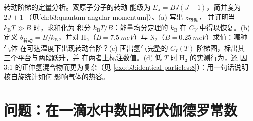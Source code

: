 \begin{exercise}[$\star\star\star$]\label{exo:b3:canonical-ensemble:12}
转动阶梯的定量分析。双原子分子的转动
能级为 $E_J = BJ(J+1)$，简并度为 $2J + 1$
（见\cref{ch:b3:quantum-angular-momentum}）。(a) 写出 $z_{\text{转动}}$，
并证明当 $k_{\text{B}}T \gg B$ 时，求和化为
积分 $k_{\text{B}}T/B$：能量均分定理的 $k_{\text{B}}$ 在
$C_V$ 中得以恢复。(b) 定义 $\theta_{\text{转动}} =
B/k_{\text{B}}$，并对 H$_2$（$B = \qty{7.5}{meV}$）与
N$_2$（$B = \qty{0.25}{meV}$）求值：哪种气体
在可达温度下出现转动台阶？(c) 画出氢气完整的 $C_V(T)$
阶梯图，标出其三个平台与两段跃升，并
在两者上标注数值。(d) 低 $T$ 时 H$_2$ 的实测行为，还
因 3:1 的正仲氢混合物而更为复杂（见
\cref{exo:b3:identical-particles:8}）：用一句话说明核自旋统计如何
影响气体的热容。
\end{exercise}

\section{问题：在一滴水中数出阿伏伽德罗常数}

